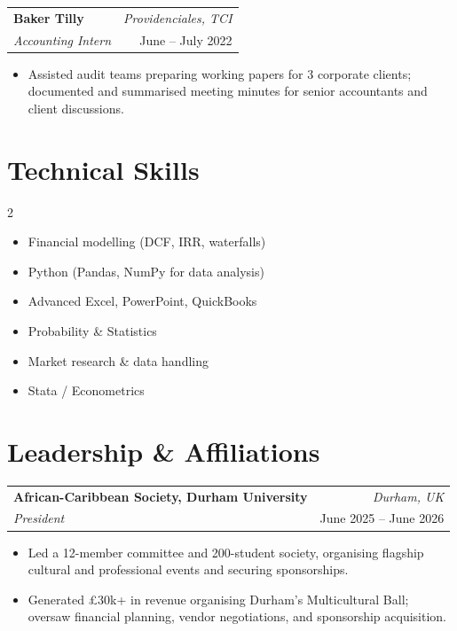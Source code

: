 \documentclass[10pt, a4paper]{article}
\makeatletter
\newcommand{\entry}[4]{%
  \noindent
  \begin{tabularx}{\linewidth}{@{}X r@{}}
    \textbf{#1} & {\small\textit{#2}} \\[-2pt]
    \textit{#3} & {\small #4}
  \end{tabularx}\vspace{1pt}%
}
\makeatother
\begin{document}
\vspace{4pt}
\entry{Baker Tilly}{Providenciales, TCI}
  {Accounting Intern}{June -- July 2022}
\begin{itemize}
  \item Assisted audit teams preparing working papers for 3 corporate clients; documented and summarised meeting minutes for senior accountants and client discussions.
\end{itemize}

\section{Technical Skills}

\begin{multicols}{2}
\begin{itemize}
  \item Financial modelling (DCF, IRR, waterfalls)
  \item Python (Pandas, NumPy for data analysis)
  \item Advanced Excel, PowerPoint, QuickBooks
  \item Probability \& Statistics
  \item Market research \& data handling
  \item Stata / Econometrics
\end{itemize}
\end{multicols}

\section{Leadership \& Affiliations}

\entry{African-Caribbean Society, Durham University}{Durham, UK}
  {President}{June 2025 -- June 2026}
\begin{itemize}
  \item Led a 12-member committee and 200-student society, organising flagship cultural and professional events and securing sponsorships.
  \item Generated \pounds30k+ in revenue organising Durham's Multicultural Ball; oversaw financial planning, vendor negotiations, and sponsorship acquisition.
\end{itemize}

\vspace{4pt}
\end{document}
